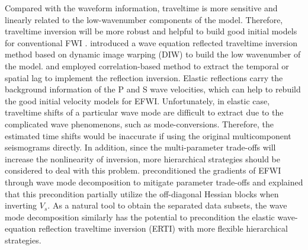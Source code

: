 Compared with the waveform information, 
traveltime is more sensitive and linearly related to
the low-wavenumber components of the model. Therefore, traveltime inversion will be more robust and helpful to
build good initial models for conventional FWI
\cite[]{WangEtAl2014}.
\cite{Ma2013} introduced a wave equation reflected traveltime inversion method
based on dynamic image warping (DIW) to build the low wavenumber of the model. 
\cite{Chi2015} and \cite{Wang2015} employed correlation-based method to extract the
temporal or spatial lag to implement the reflection inversion. 
Elastic reflections carry the background information of the P and S wave velocities, 
which can help to rebuild the good initial velocity models for EFWI.
Unfortunately, in elastic case, traveltime shifts of a particular wave mode are difficult
to extract due to the complicated wave phenomenons, such as mode-conversions.
Therefore, the estimated time shifts would be inaccurate if using the
original multicomponent seismograms directly.
In addition, since the multi-parameter trade-offs will increase the
nonlinearity of inversion, more hierarchical strategies should be considered to deal
with this problem.
\cite{WangEtAl2017} 
preconditioned the gradients of EFWI through wave mode decomposition to mitigate
parameter trade-offs and explained that this precondition partially utilize the off-diagonal Hessian blocks
when inverting $V_s$.  
As a natural tool to obtain the separated data subsets, the wave mode decomposition similarly
has the potential to precondition the elastic wave-equation reflection traveltime
inversion (ERTI) with more flexible hierarchical strategies.




